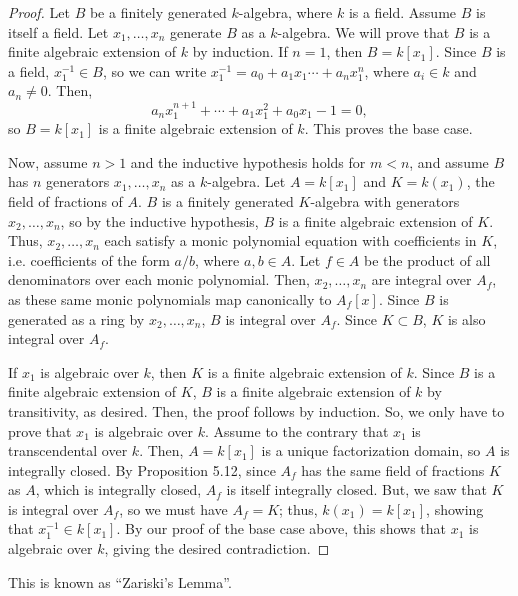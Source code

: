 \begin{proof}
Let $B$ be a finitely generated $k$-algebra, where $k$ is a field. Assume $B$ is itself a field. Let $x_1,\ldots,x_n$ generate $B$ as a $k$-algebra.
We will prove that $B$ is a finite algebraic extension of $k$ by induction. If $n = 1$, then $B = k[x_1]$. Since $B$ is a field, $x_1^{-1} \in B$, so we
can write $x_1^{-1} = a_0 + a_1 x_1 \cdots + a_n x_1^n$, where $a_i \in k$ and $a_n \neq 0$. Then,
$$a_n x_1^{n+1} + \cdots + a_1 x_1^2 + a_0 x_1 - 1 = 0,$$
so $B = k[x_1]$ is a finite algebraic extension of $k$. This proves the base case.

Now, assume $n > 1$ and the inductive hypothesis holds for $m < n$, and assume $B$ has $n$ generators $x_1,\ldots,x_n$ as a $k$-algebra. Let $A = k[x_1]$
and $K = k(x_1)$, the field of fractions of $A$. $B$ is a finitely generated $K$-algebra with generators $x_2,\ldots,x_n$, so by the inductive hypothesis,
$B$ is a finite algebraic extension of $K$. Thus, $x_2,\ldots,x_n$ each satisfy a monic polynomial equation with coefficients in $K$, i.e. coefficients of
the form $a/b$, where $a,b \in A$. Let $f \in A$ be the product of all denominators over each monic polynomial. Then, $x_2,\ldots,x_n$ are integral over $A_f$,
as these same monic polynomials map canonically to $A_f[x]$. Since $B$ is generated as a ring by $x_2,\ldots,x_n$, $B$ is integral over $A_f$. Since $K \subset B$,
$K$ is also integral over $A_f$.

If $x_1$ is algebraic over $k$, then $K$ is a finite algebraic extension of $k$. Since $B$ is a finite algebraic extension of $K$, $B$ is a finite algebraic extension
of $k$ by transitivity, as desired. Then, the proof follows by induction. So, we only have to prove that $x_1$ is algebraic over $k$. Assume to the contrary that
$x_1$ is transcendental over $k$. Then, $A = k[x_1]$ is a unique factorization domain, so $A$ is integrally closed. By Proposition 5.12, since $A_f$ has the same
field of fractions $K$ as $A$, which is integrally closed, $A_f$ is itself integrally closed. But, we saw that $K$ is integral over $A_f$, so we must have $A_f = K$;
thus, $k(x_1) = k[x_1]$, showing that $x_1^{-1} \in k[x_1]$. By our proof of the base case above, this shows that $x_1$ is algebraic over $k$, giving the desired
contradiction.
\end{proof}

\begin{remark}
This is known as ``Zariski's Lemma''.
\end{remark}

